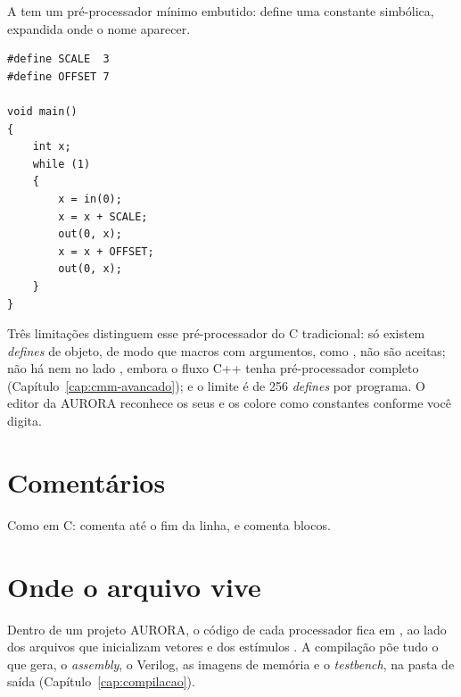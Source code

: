A \cmm{} tem um pré-processador mínimo embutido:  define uma constante simbólica, expandida onde o nome aparecer.

\begin{lstlisting}[style=cmm]
#define SCALE  3
#define OFFSET 7

void main()
{
    int x;
    while (1)
    {
        x = in(0);
        x = x + SCALE;
        out(0, x);
        x = x + OFFSET;
        out(0, x);
    }
}
\end{lstlisting}

Três limitações distinguem esse pré-processador do C tradicional: só existem \textit{defines} de objeto, de modo que macros com argumentos, como , não são aceitas; não há  nem  no lado \cmm{}, embora o fluxo C++ tenha pré-processador completo (Capítulo~\ref{cap:cmm-avancado}); e o limite é de 256 \textit{defines} por programa. O editor da AURORA reconhece os seus  e os colore como constantes conforme você digita.

\section{Comentários}

Como em C: \code{//} comenta até o fim da linha, e  comenta blocos.

\section{Onde o arquivo vive}

Dentro de um projeto AURORA, o código de cada processador fica em , ao lado dos arquivos que inicializam vetores e dos estímulos . A compilação põe tudo o que gera, o \textit{assembly}, o Verilog, as imagens de memória e o \textit{testbench}, na pasta de saída  (Capítulo~\ref{cap:compilacao}).
